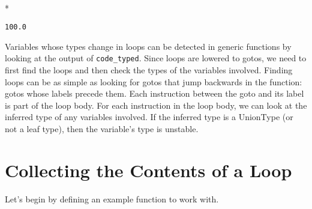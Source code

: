 \documentclass[letterpaper,10pt,english]{/Users/danluu/anaconda/lib/python2.7/site-packages/sphinx/texinputs/sphinxhowto}
\def\smaller{\fontsize{9.5pt}{9.5pt}\selectfont}
\newenvironment{InvisibleVerbatim}
        {\begin{mdframed}[leftmargin=0.1\linewidth,innerleftmargin=3pt,innerrightmargin=3pt, userdefinedwidth=1\linewidth, linewidth=0pt, linecolor=white, usetwoside=false]}
        {\end{mdframed}}
\begin{document}
    

        
        

            
                \makebox[0.1\linewidth]{\smaller\hfill\tt\color{nbframe-out-prompt}Out\hspace{4pt}{[}27{]}:\hspace{4pt}}\\*
                \vspace{-2.55\baselineskip}\begin{InvisibleVerbatim}
                \vspace{-0.5\baselineskip}
\begin{alltt}100.0\end{alltt}

            \end{InvisibleVerbatim}
            
        
    
Variables whose types change in loops can be detected in generic
functions by looking at the output of \texttt{code\_typed}. Since loops
are lowered to gotos, we need to first find the loops and then check the
types of the variables involved. Finding loops can be as simple as
looking for gotos that jump backwards in the function: gotos whose
labels precede them. Each instruction between the goto and its label is
part of the loop body. For each instruction in the loop body, we can
look at the inferred type of any variables involved. If the inferred
type is a UnionType (or not a leaf type), then the variable's type is
unstable.\section{Collecting the Contents of a Loop}Let's begin by defining an example function to work with.

\end{document}
